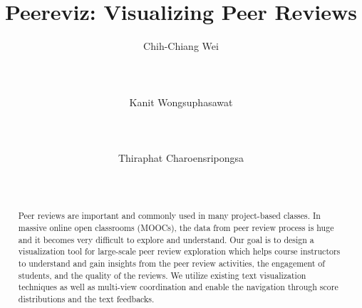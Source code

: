 \documentclass{sigchi}
\begin{document}
\title{Peereviz: Visualizing Peer Reviews}

\author{
  \alignauthor Chih-Chiang Wei\\
    \\
    \\
    \\
  \alignauthor Kanit Wongsuphasawat\\
    \\
    \\
    \\
  \alignauthor Thiraphat Charoensripongsa\\
    \\
    \\
}


\maketitle

\begin{abstract}


Peer reviews are important and commonly used in many project-based classes. In
massive online open classrooms (MOOCs), the data from peer review process is
huge and it becomes very difficult to explore and understand. Our goal is to
design a visualization tool for large-scale peer review exploration which helps
course instructors to understand and gain insights from the peer review
activities, the engagement of students, and the quality of the reviews. We
utilize existing text visualization techniques as well as multi-view
coordination and enable the navigation through score distributions and the text
feedbacks.

\end{abstract}

\end{document}
